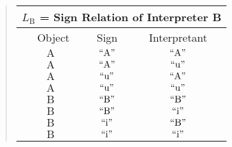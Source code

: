 \documentclass[12pt]{article}
\begin{document}
\begin{quote}
\begin{tabular}{|c|c|c|}
\multicolumn{3}{c}{$L_{\mathrm{B}}$ = Sign Relation of Interpreter B} \\
\hline\
Object       & Sign            & Interpretant     \\
\hline\hline
$\mathrm{A}$ & $\mathrm{``A"}$ & $\mathrm{``A"}$  \\
\hline
$\mathrm{A}$ & $\mathrm{``A"}$ & $\mathrm{``u"}$  \\
\hline
$\mathrm{A}$ & $\mathrm{``u"}$ & $\mathrm{``A"}$  \\
\hline
$\mathrm{A}$ & $\mathrm{``u"}$ & $\mathrm{``u"}$  \\
\hline
$\mathrm{B}$ & $\mathrm{``B"}$ & $\mathrm{``B"}$  \\
\hline
$\mathrm{B}$ & $\mathrm{``B"}$ & $\mathrm{``i"}$  \\
\hline
$\mathrm{B}$ & $\mathrm{``i"}$ & $\mathrm{``B"}$  \\
\hline
$\mathrm{B}$ & $\mathrm{``i"}$ & $\mathrm{``i"}$  \\
\hline
\end{tabular}
\end{quote}

\end{document}
